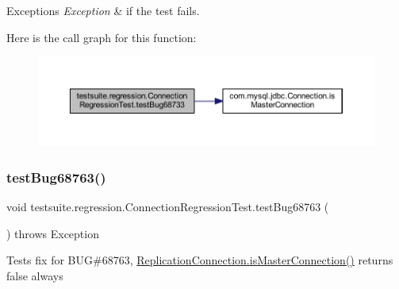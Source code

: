 \begin{DoxyExceptions}{Exceptions}
{\em Exception} & if the test fails. \\
\hline
\end{DoxyExceptions}
Here is the call graph for this function\+:
\nopagebreak
\begin{figure}[H]
\begin{center}
\leavevmode
\includegraphics[width=350pt]{classtestsuite_1_1regression_1_1_connection_regression_test_a9d54ba5c540e24424893bc15c83312ac_cgraph}
\end{center}
\end{figure}
\mbox{\label{classtestsuite_1_1regression_1_1_connection_regression_test_ad20cb3d4d184371c5cbf7e540726e6a6}} 
\subsubsection{\texorpdfstring{test\+Bug68763()}{testBug68763()}}
{\footnotesize\ttfamily void testsuite.\+regression.\+Connection\+Regression\+Test.\+test\+Bug68763 (\begin{DoxyParamCaption}{ }\end{DoxyParamCaption}) throws Exception}

Tests fix for B\+UG\#68763, \mbox{\hyperlink{interfacecom_1_1mysql_1_1jdbc_1_1_connection_a39d6c162da8f21b7c2a3299f91e7c65a}{Replication\+Connection.\+is\+Master\+Connection()}} returns false always


